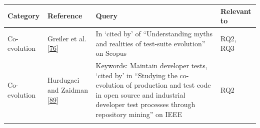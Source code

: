 \documentclass[]{book}
\begin{document}
\begin{longtable}[]{@{}llll@{}}
\toprule
\begin{minipage}[b]{0.18\columnwidth}\raggedright\strut
Category\strut
\end{minipage} & \begin{minipage}[b]{0.16\columnwidth}\raggedright\strut
Reference\strut
\end{minipage} & \begin{minipage}[b]{0.50\columnwidth}\raggedright\strut
Query\strut
\end{minipage} & \begin{minipage}[b]{0.04\columnwidth}\raggedright\strut
Relevant to\strut
\end{minipage}\tabularnewline
\midrule
\endhead
\begin{minipage}[t]{0.18\columnwidth}\raggedright\strut
Co-evolution\strut
\end{minipage} & \begin{minipage}[t]{0.16\columnwidth}\raggedright\strut
Greiler et al. {[}\protect\hyperlink{ref-greiler2013}{76}{]}\strut
\end{minipage} & \begin{minipage}[t]{0.50\columnwidth}\raggedright\strut
In `cited by' of ``Understanding myths and realities of test-suite
evolution'' on Scopus\strut
\end{minipage} & \begin{minipage}[t]{0.04\columnwidth}\raggedright\strut
RQ2, RQ3\strut
\end{minipage}\tabularnewline
\begin{minipage}[t]{0.18\columnwidth}\raggedright\strut
Co-evolution\strut
\end{minipage} & \begin{minipage}[t]{0.16\columnwidth}\raggedright\strut
Hurdugaci and Zaidman
{[}\protect\hyperlink{ref-hurdugaci2012}{89}{]}\strut
\end{minipage} & \begin{minipage}[t]{0.50\columnwidth}\raggedright\strut
Keywords: Maintain developer tests, `cited by' in ``Studying the
co-evolution of production and test code in open source and industrial
developer test processes through repository mining'' on IEEE\strut
\end{minipage} & \begin{minipage}[t]{0.04\columnwidth}\raggedright\strut
RQ2\strut
\end{minipage}\tabularnewline
\begin{minipage}[t]{0.18\columnwidth}\raggedright\strut

\end{minipage}
\end{longtable}
\end{document}
